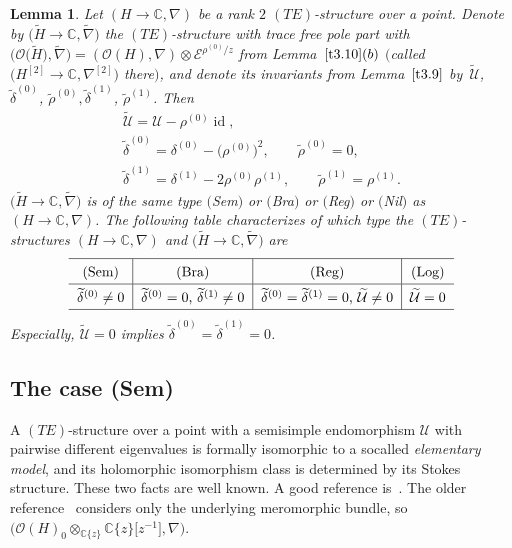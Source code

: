 \documentclass[pdftex]{sigma}%
\numberwithin{equation}{section}
\numberwithin{figure}{section}
\newcommand{\C}{{\mathbb C}}
\newcommand{\EE}{{\mathcal E}}
\newcommand{\OO}{{\mathcal O}}
\newcommand{\UU}{{\mathcal U}}
\newcommand{\www}{\widetilde}
\newcommand{\nnn}{\nabla}
\DeclareMathOperator{\id}{id}
\newtheorem{Lemma}[Theorem]{Lemma}
\begin{document}
\begin{Lemma}\label{t4.3}
Let $(H\to\C,\nnn)$ be a rank $2$ $(TE)$-structure over a point.
Denote by $\big(\www H\to\C,\www\nnn\big)$ the $(TE)$-structure
with trace free pole part with
$\big(\OO\big(\www H\big),\www\nnn\big)=(\OO(H),\nnn)\otimes\EE^{\rho^{(0)}/z}$
from Lemma~$\ref{t3.10}(b)$
$\big($called $\big(H^{[2]}\to\C,\nnn^{[2]}\big)$ there$\big)$,
and denote its invariants from Lemma~$\ref{t3.9}$
by~$\www\UU$,~$\www\delta^{(0)}$, $\www\rho^{(0)},
\www\delta^{(1)}$, $\www\rho^{(1)}$. Then
\begin{gather*}%
\www\UU= \UU-\rho^{(0)}\id,
\\
\www\delta^{(0)}= \delta^{(0)}-\big(\rho^{(0)}\big)^2,\qquad
\www\rho^{(0)}=0,\nonumber
\\
\www\delta^{(1)}= \delta^{(1)}-2\rho^{(0)}\rho^{(1)},\qquad
\www\rho^{(1)}=\rho^{(1)}.
\end{gather*}
$\big(\www H\to\C,\www\nnn\big)$ is of the same type $($Sem$)$ or $($Bra$)$
or $($Reg$)$ or $($Nil$)$ as $(H\to\C,\nnn)$.
The following table characterizes of which type the
$(TE)$-structures $(H\to\C,\nnn)$ and
$\big(\www H\to\C,\www\nnn\big)$ are
\[
\def\arraystretch{1.5}
\begin{tabular}{c|c|c|c}
\hline
$($Sem$)$ & $($Bra$)$ &$($Reg$)$ &$($Log$)$
\\ \hline
$\www\delta^{(0)}\neq 0$ & $\www\delta^{(0)}=0$, $\www\delta^{(1)}\neq 0$
&$\www\delta^{(0)}=\www \delta^{(1)}=0$, $\www\UU\neq 0$ & $\www\UU=0$
\\
\hline
\end{tabular}
\]
Especially, $\www\UU=0$ implies $\www\delta^{(0)}=
\www\delta^{(1)}=0$.
\end{Lemma}



\subsection{The case (Sem)}%


A $(TE)$-structure over a point with a semisimple
endomorphism $\UU$ with pairwise different eigenvalues
is formally isomorphic to a socalled {\it elementary model},
and its holomorphic isomorphism class is determined
by its Stokes structure. These two facts are well known.
A good reference is~\cite[Chapter~II, Sections~5 and~6]{Sa02}.
The older reference~\cite{Ma83a} considers only
the underlying meromorphic bundle, so
$\big(\OO(H)_0\otimes_{\C\{z\}}\C\{z\}\big[z^{-1}\big],\nnn\big)$.
\end{document}
